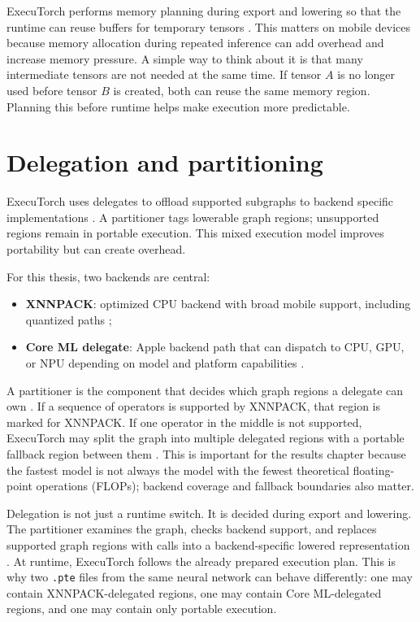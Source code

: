 ExecuTorch performs memory planning during export and lowering so that the
runtime can reuse buffers for temporary tensors \cite{executorch_memory}. This
matters on mobile devices because memory allocation during repeated inference
can add overhead and increase memory pressure. A simple way to think about it
is that many intermediate tensors are not needed at the same time. If tensor
\(A\) is no longer used before tensor \(B\) is created, both can reuse the same
memory region. Planning this before runtime helps make execution more
predictable.

\section{Delegation and partitioning}

ExecuTorch uses delegates to offload supported subgraphs to backend specific
implementations \cite{executorch_delegate}. A partitioner tags lowerable graph
regions; unsupported regions remain in portable execution. This mixed execution
model improves portability but can create overhead.

For this thesis, two backends are central:
\begin{itemize}
    \item \textbf{XNNPACK}: optimized CPU backend with broad mobile support,
          including quantized paths \cite{executorch_xnnpack,executorch_xnnpack_quantization,xnnpack_repo};
    \item \textbf{Core ML delegate}: Apple backend path that can dispatch to CPU,
          GPU, or NPU depending on model and platform capabilities
          \cite{executorch_coreml,apple_coreml}.
\end{itemize}

A partitioner is the component that decides which graph regions a delegate can
own \cite{executorch_delegate}. If a sequence of operators is supported by
XNNPACK, that region is marked for XNNPACK. If one
operator in the middle is not supported, ExecuTorch may split the graph into
multiple delegated regions with a portable fallback region between them
\cite{executorch_delegate}. This is important for the results chapter because
the fastest model is not always the model with the fewest theoretical floating-point operations (FLOPs); backend coverage and fallback boundaries also
matter.

Delegation is not just a runtime switch. It is decided during export and
lowering. The partitioner examines the graph, checks backend support, and
replaces supported graph regions with calls into a backend-specific lowered
representation \cite{executorch_delegate}. At runtime, ExecuTorch follows the
already prepared execution plan. This is why two \texttt{.pte} files from the
same neural network can behave differently: one may contain XNNPACK-delegated
regions, one may contain Core ML-delegated regions, and one may contain only
portable execution.

